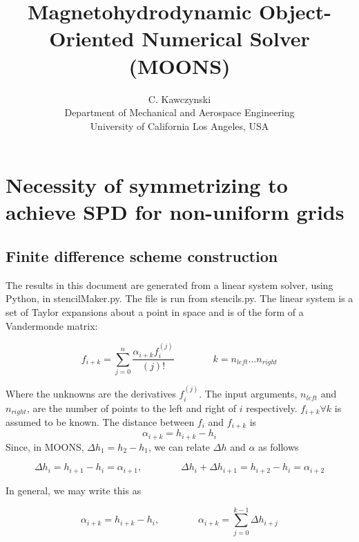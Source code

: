 \documentclass[landscape]{article}
\begin{document}
\doublespacing
\title{Magnetohydrodynamic Object-Oriented Numerical Solver (MOONS)}
\author{C. Kawczynski \\
Department of Mechanical and Aerospace Engineering \\
University of California Los Angeles, USA\\
}
\maketitle

\section{Necessity of symmetrizing to achieve SPD for non-uniform grids}

\subsection{Finite difference scheme construction}

The results in this document are generated from a linear system solver, using Python, in stencilMaker.py. The file is run from stencils.py. The linear system is a set of Taylor expansions about a point in space and is of the form of a Vandermonde matrix:

\begin{equation}
  f_{i+k}
  =
  \sum_{j=0}^n
  \frac{\alpha_{i+k} f_{i}^{(j)}}{(j)!}
  \qquad \qquad
  k = n_{left} \dots n_{right}
\end{equation}

Where the unknowns are the derivatives $f_i^{(j)}$. The input arguments, $n_{left}$ and $n_{right}$, are the number of points to the left and right of $i$ respectively. $f_{i+k}\forall k$ is assumed to be known. The distance between $f_{i}$ and $f_{i+k}$ is
\begin{equation}
  \alpha_{i+k} 
  =
  h_{i+k} - h_{i}
\end{equation}
Since, in MOONS, $\Delta h_1 = h_2 - h_1$, we can relate $\Delta h$ and $\alpha$ as follows

\begin{equation}
  \Delta h_{i} = h_{i+1} - h_{i} = \alpha_{i+1}
  ,\qquad \qquad
  \Delta h_{i} + \Delta h_{i+1} = h_{i+2} - h_{i} = \alpha_{i+2}
\end{equation}

In general, we may write this as

\begin{equation}
  \alpha_{i+k} = h_{i+k} - h_{i}
  ,\qquad \qquad
  \alpha_{i+k} = \sum_{j=0}^{k-1} \Delta h_{i+j}
\end{equation}
\end{document}
